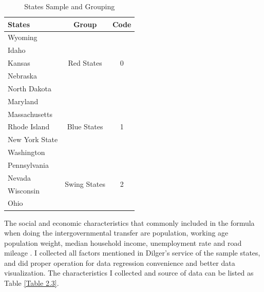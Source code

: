 \begin{table}[htbp]
  \centering
  \caption{States Sample and Grouping}
    \begin{tabular}{p{7.57em}cc}
    \toprule
    States & \multicolumn{1}{p{7.93em}}{Group} & \multicolumn{1}{p{6.855em}}{Code} \\
    \midrule
    Wyoming & \multicolumn{1}{c}{\multirow{5}[2]{*}{Red States}} & \multirow{5}[2]{*}{0} \\
    Idaho &       &  \\
    Kansas &       &  \\
    Nebraska &       &  \\
    North Dakota &       &  \\
    \midrule
    Maryland & \multicolumn{1}{c}{\multirow{5}[2]{*}{Blue States}} & \multirow{5}[2]{*}{1} \\
    Massachusetts &       &  \\
    Rhode Island &       &  \\
    New York State &       &  \\
    Washington &       &  \\
    \midrule
    Pennsylvania & \multicolumn{1}{c}{\multirow{4}[2]{*}{Swing States}} & \multirow{4}[2]{*}{2} \\
    Nevada &       &  \\
    Wisconsin &       &  \\
    Ohio  &       &  \\
    \bottomrule
    \end{tabular}%
  \label{Table 2.2}%
\end{table}%

 The social and economic characteristics that commonly included in the formula when doing the intergovernmental transfer are population, working age population weight, median household income, unemployment rate and road mileage \cite{dilger2015federal}. I collected all factors mentioned in Dilger's service\cite{dilger2015federal} of the sample states, and did proper operation for data regression convenience and better data visualization. The characteristics I collected and source of data can be listed as Table \ref*{Table 2.3}.

